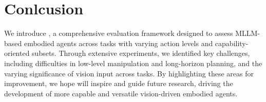 \section{Conlcusion}

We introduce \name, a comprehensive evaluation framework designed to assess MLLM-based embodied agents across tasks with varying action levels and capability-oriented subsets. Through extensive experiments, we identified key challenges, including difficulties in low-level manipulation and long-horizon planning, and the varying significance of vision input across tasks. By highlighting these areas for improvement, we hope \name will inspire and guide future research, driving the development of more capable and versatile vision-driven embodied agents. 

